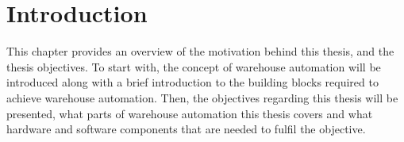 \chapter{Introduction}
This chapter provides an overview of the motivation behind this thesis, and the thesis objectives. To start with, the concept of warehouse automation will be introduced along with a brief introduction to the building blocks required to achieve warehouse automation. Then, the objectives regarding this thesis will be presented, what parts of warehouse automation this thesis covers and what hardware and software components that are needed to fulfil the objective.




